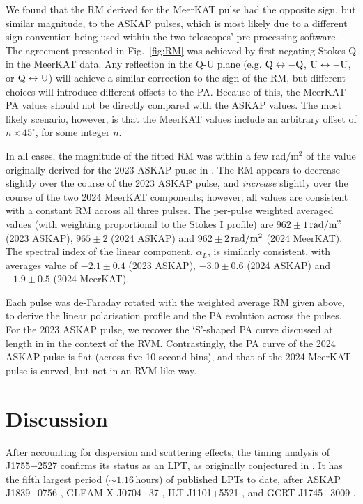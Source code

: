 \documentclass[fleqn,usenatbib]{mnras}
\newcommand{\src}{J1755$-$2527}
\newcommand{\Fig}{Fig.}
\begin{document}
We found that the RM derived for the MeerKAT pulse had the opposite sign, but similar magnitude, to the ASKAP pulses, which is most likely due to a different sign convention being used within the two telescopes' pre-processing software.
The agreement presented in \Fig~\ref{fig:RM} was achieved by first negating Stokes Q in the MeerKAT data.
Any reflection in the Q-U plane (e.g. ${\rm Q} \leftrightarrow -{\rm Q}$, ${\rm U} \leftrightarrow -{\rm U}$, or ${\rm Q} \leftrightarrow {\rm U}$) will achieve a similar correction to the sign of the RM, but different choices will introduce different offsets to the PA.
Because of this, the MeerKAT PA values should not be directly compared with the ASKAP values.
The most likely scenario, however, is that the MeerKAT values include an arbitrary offset of $n \times 45^\circ$, for some integer $n$.

In all cases, the magnitude of the fitted RM was within a few rad/m$^2$ of the value originally derived for the 2023 ASKAP pulse in .
The RM appears to decrease slightly over the course of the 2023 ASKAP pulse, and \emph{increase} slightly over the course of the two 2024 MeerKAT components; however, all values are consistent with a constant RM across all three pulses.
The per-pulse weighted averaged values (with weighting proportional to the Stokes I profile) are $962 \pm 1$\,${\rm rad}/{\rm m}^2$ (2023 ASKAP), $965 \pm 2$ (2024 ASKAP) and $962 \pm 2$\,${\rm rad}/{\rm m}^2$ (2024 MeerKAT).
The spectral index of the linear component, $\alpha_L$, is similarly consistent, with averages value of $-2.1 \pm 0.4$ (2023 ASKAP), $-3.0 \pm 0.6$ (2024 ASKAP) and $-1.9 \pm 0.5$ (2024 MeerKAT).

Each pulse was de-Faraday rotated with the weighted average RM given above, to derive the linear polarisation profile and the PA evolution across the pulses.
For the 2023 ASKAP pulse, we recover the `S'-shaped PA curve discussed at length in  in the context of the RVM.
Contrastingly, the PA curve of the 2024 ASKAP pulse is flat (across five 10-second bins), and that of the 2024 MeerKAT pulse is curved, but not in an RVM-like way.

\section{Discussion} \label{sec:discussion}

After accounting for dispersion and scattering effects, the timing analysis of \src{} confirms its status as an LPT, as originally conjectured in .
It has the fifth largest period (${\sim}1.16\,$hours) of published LPTs to date, after ASKAP J1839$-$0756 \citep[$6.45\,$hours;][]{Lee2025}, GLEAM-X J0704$-$37 \citep[$2.92\,$hours;][]{2024ApJ...976L..21H,2025A&A...695L...8R}, ILT J1101+5521 \citep[$2.09\,$hours;][]{deRuiter2025}, and GCRT J1745$-$3009 \citep[$1.28\,$hours;][]{2005Natur.434...50H}.
\end{document}
